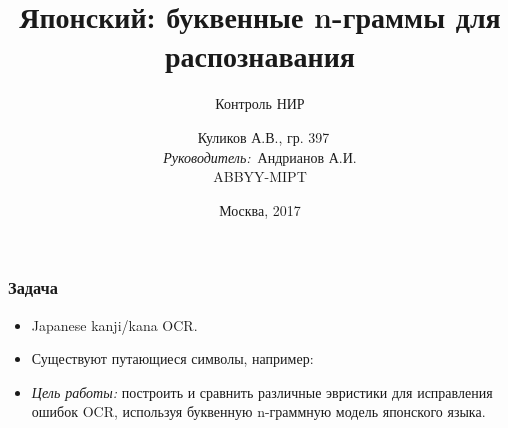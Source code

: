 \documentclass[14pt]{beamer}
\title{\small{Японский: буквенные n-граммы для распознавания}}
\subtitle{\footnotesize{Контроль НИР}}
\author{\small{%
~Куликов А.В., гр. 397\\%
\emph{Руководитель:}~Андрианов А.И.}\\%
\vspace{30pt}%
ABBYY-MIPT%
\vspace{20pt}%
}
\date{\small{Москва, 2017}}
\begin{document}
\maketitle

\begin{frame}

\frametitle{Задача}
\begin{itemize}
    \item Japanese kanji/kana OCR.
    \item Существуют путающиеся символы, например:
    \begin{figure}[h]
    \end{figure}
    \item \emph{Цель работы: } построить и сравнить различные эвристики для исправления ошибок OCR, используя буквенную n-граммную модель японского языка.
\end{itemize}
\end{frame}
\end{document}
